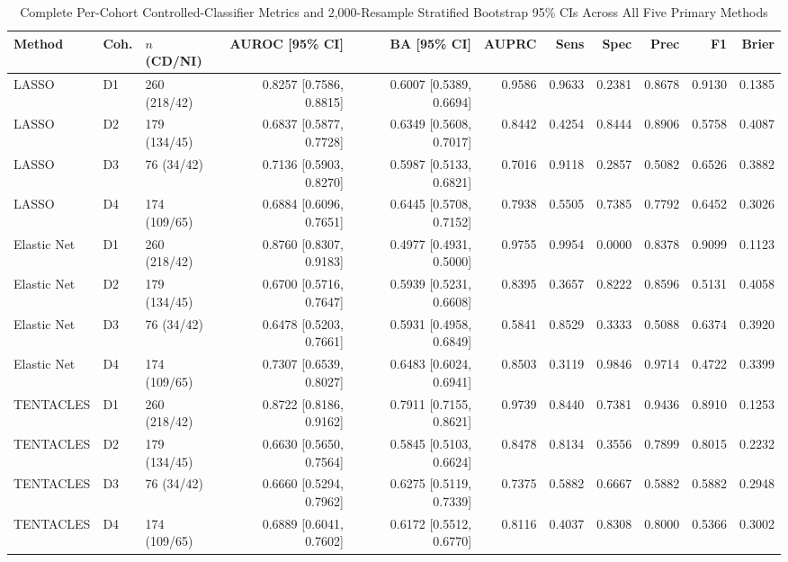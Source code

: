 \begin{table}[!htbp]
\centering
\caption{Complete Per-Cohort Controlled-Classifier Metrics and 2,000-Resample Stratified Bootstrap 95\% CIs Across All Five Primary Methods}
\label{tab:s1}
\footnotesize
\setlength{\tabcolsep}{3.5pt}
\renewcommand{\arraystretch}{1.12}
\begin{tabular}{@{}lllrrrrrrrr@{}}
\toprule
Method & Coh. & $n$ (CD/NI) & AUROC [95\% CI] & BA [95\% CI] & AUPRC & Sens & Spec & Prec & F1 & Brier \\
\midrule
LASSO & D1 & 260 (218/42) & 0.8257 [0.7586, 0.8815] & 0.6007 [0.5389, 0.6694] & 0.9586 & 0.9633 & 0.2381 & 0.8678 & 0.9130 & 0.1385 \\
LASSO & D2 & 179 (134/45) & 0.6837 [0.5877, 0.7728] & 0.6349 [0.5608, 0.7017] & 0.8442 & 0.4254 & 0.8444 & 0.8906 & 0.5758 & 0.4087 \\
LASSO & D3 & 76 (34/42) & 0.7136 [0.5903, 0.8270] & 0.5987 [0.5133, 0.6821] & 0.7016 & 0.9118 & 0.2857 & 0.5082 & 0.6526 & 0.3882 \\
LASSO & D4 & 174 (109/65) & 0.6884 [0.6096, 0.7651] & 0.6445 [0.5708, 0.7152] & 0.7938 & 0.5505 & 0.7385 & 0.7792 & 0.6452 & 0.3026 \\
\midrule
Elastic Net & D1 & 260 (218/42) & 0.8760 [0.8307, 0.9183] & 0.4977 [0.4931, 0.5000] & 0.9755 & 0.9954 & 0.0000 & 0.8378 & 0.9099 & 0.1123 \\
Elastic Net & D2 & 179 (134/45) & 0.6700 [0.5716, 0.7647] & 0.5939 [0.5231, 0.6608] & 0.8395 & 0.3657 & 0.8222 & 0.8596 & 0.5131 & 0.4058 \\
Elastic Net & D3 & 76 (34/42) & 0.6478 [0.5203, 0.7661] & 0.5931 [0.4958, 0.6849] & 0.5841 & 0.8529 & 0.3333 & 0.5088 & 0.6374 & 0.3920 \\
Elastic Net & D4 & 174 (109/65) & 0.7307 [0.6539, 0.8027] & 0.6483 [0.6024, 0.6941] & 0.8503 & 0.3119 & 0.9846 & 0.9714 & 0.4722 & 0.3399 \\
\midrule
TENTACLES & D1 & 260 (218/42) & 0.8722 [0.8186, 0.9162] & 0.7911 [0.7155, 0.8621] & 0.9739 & 0.8440 & 0.7381 & 0.9436 & 0.8910 & 0.1253 \\
TENTACLES & D2 & 179 (134/45) & 0.6630 [0.5650, 0.7564] & 0.5845 [0.5103, 0.6624] & 0.8478 & 0.8134 & 0.3556 & 0.7899 & 0.8015 & 0.2232 \\
TENTACLES & D3 & 76 (34/42) & 0.6660 [0.5294, 0.7962] & 0.6275 [0.5119, 0.7339] & 0.7375 & 0.5882 & 0.6667 & 0.5882 & 0.5882 & 0.2948 \\
TENTACLES & D4 & 174 (109/65) & 0.6889 [0.6041, 0.7602] & 0.6172 [0.5512, 0.6770] & 0.8116 & 0.4037 & 0.8308 & 0.8000 & 0.5366 & 0.3002 \\

\end{tabular}
\end{table}
